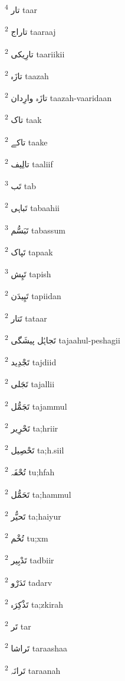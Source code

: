 \documentclass[12pt]{article}
\begin{document}
\begin{multicols}{5}
{\ur تار}   \textsuperscript{4} taar

{\ur تاراج}   \textsuperscript{2} taaraaj

{\ur تارِیکی}   \textsuperscript{2} taariikii

{\ur تازَہ}   \textsuperscript{2} taazah

{\ur تازَہ وارِدان}   \textsuperscript{2} taazah-vaaridaan

{\ur تاک}   \textsuperscript{2} taak

{\ur تاکے}   \textsuperscript{2} taake

{\ur تالِیف}   \textsuperscript{2} taaliif

{\ur تَب}   \textsuperscript{3} tab

{\ur تَباہی}   \textsuperscript{2} tabaahii

{\ur تَبَسُّم}   \textsuperscript{3} tabassum

{\ur تَپاک}   \textsuperscript{2} tapaak

{\ur تَپِش}   \textsuperscript{3} tapish

{\ur تَپِیدَن}   \textsuperscript{2} tapiidan

{\ur تَتار}   \textsuperscript{2} tataar

{\ur تَجاہُل پیشَگی}   \textsuperscript{2} tajaahul-peshagii

{\ur تَجْدِید}   \textsuperscript{2} tajdiid

{\ur تَجَلی}   \textsuperscript{2} tajallii

{\ur تَجَمُّل}   \textsuperscript{2} tajammul

{\ur تَحْرِیر}   \textsuperscript{2} ta;hriir

{\ur تَحْصِیل}   \textsuperscript{2} ta;h.siil

{\ur تُحْفَہ}   \textsuperscript{2} tu;hfah

{\ur تَحَمُّل}   \textsuperscript{2} ta;hammul

{\ur تَحیُّر}   \textsuperscript{2} ta;haiyur

{\ur تُخْم}   \textsuperscript{2} tu;xm

{\ur تَدْبِیر}   \textsuperscript{2} tadbiir

{\ur تَدَرْو}   \textsuperscript{2} tadarv

{\ur تَذْکِرَہ}   \textsuperscript{2} ta;zkirah

{\ur تَر}   \textsuperscript{2} tar

{\ur تَراشا}   \textsuperscript{2} taraashaa

{\ur تَرانَہ}   \textsuperscript{2} taraanah


\end{multicols}
\end{document}
